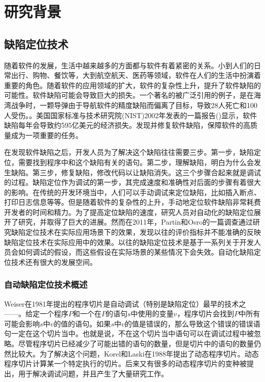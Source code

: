 \chapter{研究背景}

\section{缺陷定位技术}

随着软件的发展，生活中越来越多的方面都与软件有着紧密的关系。小到人们的日常出行、购物、餐饮等，大到航空航天、医药等领域，软件在人们的生活中扮演着重要的角色。随着软件的应用领域的扩大，软件的复杂性上升，提升了软件缺陷的可能性。软件缺陷可能会导致巨大的损失。一个著名的被广泛引用的例子，是在海湾战争时，一颗导弹由于导航软件的精度缺陷而偏离了目标，导致28人死亡和100人受伤。。美国国家标准与技术研究院(NIST)2002年发表的一篇报告()显示，软件缺陷每年会导致约595亿美元的经济损失。发现并修复软件缺陷，保障软件的高质量成为一项重要的任务。

在发现软件缺陷之后，开发人员为了解决这个缺陷往往需要三步\parencite{Parnin2011Are}。第一步，缺陷定位，需要找到程序中和这个缺陷有关的语句。第二步，理解缺陷，明白为什么会发生缺陷。第三步，修复缺陷，修改代码以让缺陷消失。这三个步骤合起来就是调试的过程。缺陷定位作为调试的第一步，其完成速度和准确性对后面的步骤有着很大的影响。在传统的开发环境当中，人们可以手动调试来定位缺陷，比如插入断点、打印日志信息等等。但是随着软件的复杂性的上升，手动地定位软件缺陷非常耗费开发者的时间和精力。为了提高定位缺陷的速度，研究人员对自动化的缺陷定位展开了研究，并取得了巨大的进展。然而在2011年，Partin和Osro的一篇调查\parencite{Parnin2011Are}通过研究缺陷定位技术在实际应用场景下的效果，发现以往的评价指标并不能准确的反映缺陷定位技术在实际应用中的效果。以往的缺陷定位技术是基于一系列关于开发人员会如何调试的假设，而这些假设在实际场景的某些情况下会失效。自动化缺陷定位技术还有很大的发展空间。

\subsection{自动缺陷定位技术概述}

Weiser在1981年提出的程序切片\parencite{Weiser1981Program,Weiser1984Program}是自动调试（特别是缺陷定位）最早的技术之——。给定一个程序$P$和一个在$P$的语句$s$中使用的变量$v$，程序切片会找到$P$中所有可能会影响$s$中$v$的值的语句。如果$s$中$v$的值是错误的，那么导致这个错误的错误语句一定在这个切片当中。也就是说，不在这个切片当中语句可以在调试过程中被忽略。尽管程序切片已经减少了可能出错的语句的数量，但是切片中的语句的数量仍然比较大。为了解决这个问题，Korel和Laski在1988年提出了动态程序切片\parencite{Korel1988Dynamic}。动态程序切片计算某一个特定执行的切片。后来又有很多的动态程序切片的变种被提出\parencite{Demillo1996Critical,Gyim1999An,Zhang2006Pruning,Zhang2003Precise}，用于解决调试问题，并且产生了大量研究工作\parencite{Agrawal1993Debugging,Liu2007Indexing,Al2005The,Alves2011Fault,Ju2014HSFal,Wotawa2010Fault,Mao2014Slice}。


